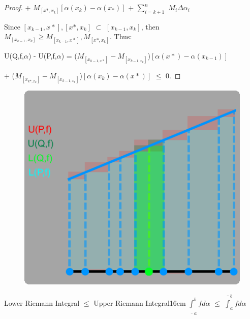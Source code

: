 \begin{proof}
        \hspace{5.2cm}
        + $M_{[x*,x_k]} [\alpha(x_k) - \alpha(x_*)]$
        + $\sum_{i=k+1}^n$ $M_i \Delta \alpha_i$

        \hspace{0.5cm}
        Since $[x_{k-1},x*],[x*,x_k]$ $\subset$ $[x_{k-1},x_k]$, then
        $M_{[x_{k-1},x_k]} \geq M_{[x_{k-1},x*]}, M_{[x*,x_k]}$.
        Thus:

        \hspace{0.5cm}
        U(Q,f,$\alpha$) - U(P,f,$\alpha$)
        = ($M_{[x_{k-1,x*}]} - M_{[x_{k-1,x_k}]}$)$[\alpha(x*) - \alpha(x_{k-1})]$

        \hspace{4.5cm}
        + ($M_{[x_{k*,x_k}]} - M_{[x_{k-1,x_k}]}$)$[\alpha(x_k) - \alpha(x*)]$
        $\leq$ 0.
    \end{proof}



    \begin{figure}[h]
        \centering
        \includegraphics[scale=0.45]{Images/13.1.4.png}
    \end{figure}


    
    \begin{wtheorem}{Lower Riemann Integral $\leq$ Upper Riemann Integral}{16cm}
        $\underline{\int}_a^b f d \alpha$ $\leq$ $\overline{\int}_a^b f d \alpha$        
    \end{wtheorem}
    
